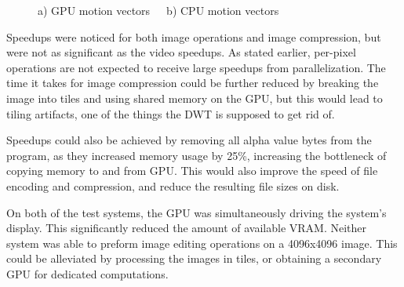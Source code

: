 \documentclass[10pt,twocolumn,twoside]{IEEEtran}
\begin{document}
\begin{figure}[htdp]
\begin{center}
\caption{a) GPU motion vectors\ \ \ b) CPU motion vectors}
\label{fig:MotionVectors}
\end{center}
\end{figure}

Speedups were noticed for both image operations and image compression, but were not as significant as the 
video speedups. As stated earlier, per-pixel operations are not expected to receive large speedups from 
parallelization. The time it takes for image compression could be further reduced by breaking the image into 
tiles and using shared memory on the GPU, but this would lead to tiling artifacts, one of the things the DWT 
is supposed to get rid of.

Speedups could also be achieved by removing all alpha value bytes from the program, as they increased memory 
usage by 25\%, increasing the bottleneck of copying memory to and from GPU. This would also improve the speed 
of file encoding and compression, and reduce the resulting file sizes on disk.

On both of the test systems, the GPU was simultaneously driving the system's display. This significantly 
reduced the amount of available VRAM. Neither system was able to preform image editing operations on a 
4096x4096 image. This could be alleviated by processing the images in tiles, or obtaining a secondary GPU for 
dedicated computations.
\end{document}
